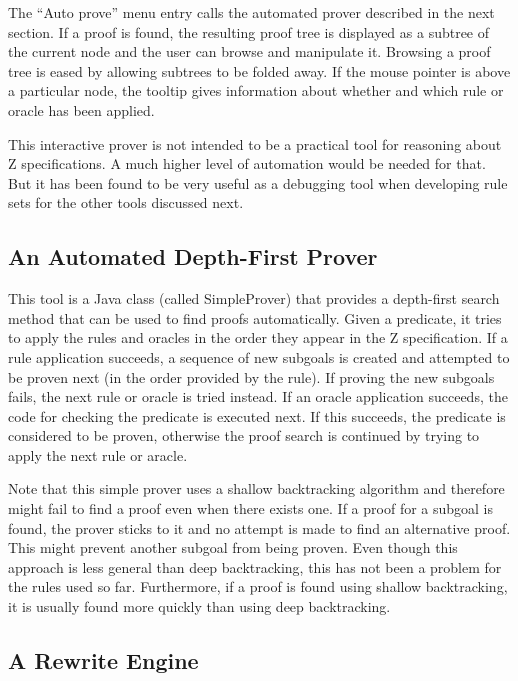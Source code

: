 \documentclass{entcs}
\begin{document}
The ``Auto prove'' menu entry calls the automated prover described in
the next section.  If a proof is found, the resulting proof tree is
displayed as a subtree of the current node and the user can browse and
manipulate it.  Browsing a proof tree is eased by allowing subtrees to
be folded away.  If the mouse pointer is above a particular node, the
tooltip gives information about whether and which rule or oracle has
been applied.

This interactive prover is not intended to be a practical tool for
reasoning about Z specifications.  A much higher level of automation
would be needed for that.  But it has been found to be very useful as
a debugging tool when developing rule sets for the other tools discussed
next. 

\subsection{An Automated Depth-First Prover}

This tool is a Java class (called SimpleProver) that provides a
depth-first search method that can be used to find proofs
automatically.  Given a predicate, it tries to apply the rules and
oracles in the order they appear in the Z specification.  If a rule
application succeeds, a sequence of new subgoals is created and
attempted to be proven next (in the order provided by the rule).  If
proving the new subgoals fails, the next rule or oracle is tried
instead.  If an oracle application succeeds, the code for checking the
predicate is executed next.  If this succeeds, the predicate is
considered to be proven, otherwise the proof search is continued by
trying to apply the next rule or aracle.

Note that this simple prover uses a shallow backtracking algorithm and
therefore might fail to find a proof even when there exists one.  If a
proof for a subgoal is found, the prover sticks to it and no attempt
is made to find an alternative proof.  This might prevent another
subgoal from being proven.  Even though this approach is less general
than deep backtracking, this has not been a problem for the rules used
so far.  Furthermore, if a proof is found using shallow backtracking,
it is usually found more quickly than using deep backtracking.

\subsection{A Rewrite Engine} \label{sec:rewrite}
\end{document}
